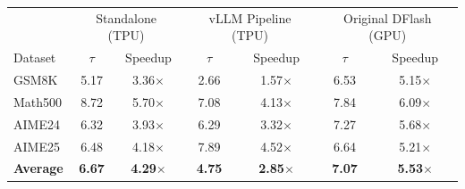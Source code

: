 \centering
\begin{tabular}{l|cc|cc|cc}
\toprule
 & \multicolumn{2}{c|}{Standalone (TPU)} & \multicolumn{2}{c|}{vLLM Pipeline (TPU)} & \multicolumn{2}{c}{Original DFlash (GPU)} \\
Dataset & $\tau$ & Speedup & $\tau$ & Speedup & $\tau$ & Speedup \\
\midrule
GSM8K   & 5.17 & 3.36$\times$ & 2.66 & 1.57$\times$ & 6.53 & 5.15$\times$ \\
Math500 & 8.72 & 5.70$\times$ & 7.08 & 4.13$\times$ & 7.84 & 6.09$\times$ \\
AIME24  & 6.32 & 3.93$\times$ & 6.29 & 3.32$\times$ & 7.27 & 5.68$\times$ \\
AIME25  & 6.48 & 4.18$\times$ & 7.89 & 4.52$\times$ & 6.64 & 5.21$\times$ \\
\midrule
\textbf{Average} & \textbf{6.67} & \textbf{4.29}$\times$ & \textbf{4.75} & \textbf{2.85}$\times$ & \textbf{7.07} & \textbf{5.53}$\times$ \\
\bottomrule
\end{tabular}
